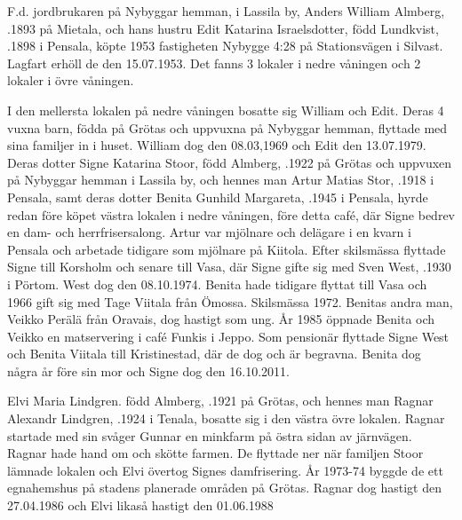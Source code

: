 
F.d. jordbrukaren på Nybyggar hemman, i Lassila by, Anders William Almberg, .1893 på Mietala, och hans hustru Edit Katarina Israelsdotter, född Lundkvist, .1898 i Pensala, köpte 1953 fastigheten Nybygge 4:28 på Stationsvägen i Silvast. Lagfart erhöll de den 15.07.1953. Det fanns 3 lokaler i nedre våningen och 2 lokaler i övre våningen.

I den mellersta lokalen på nedre våningen bosatte sig William och Edit. Deras 4 vuxna barn, födda på Grötas och uppvuxna på Nybyggar hemman, flyttade med sina familjer in i huset. William dog den 08.03,1969 och Edit den 13.07.1979. Deras dotter Signe Katarina Stoor, född Almberg, .1922 på Grötas och uppvuxen på Nybyggar hemman i Lassila by, och hennes man Artur Matias Stor, .1918 i Pensala, samt deras dotter Benita Gunhild Margareta, .1945 i Pensala, hyrde redan före köpet västra lokalen i nedre våningen, före detta café, där Signe bedrev en dam- och herrfrisersalong.
Artur var mjölnare och delägare i en kvarn i Pensala och arbetade tidigare som mjölnare på Kiitola. Efter skilsmässa flyttade Signe till Korsholm och senare till Vasa, där Signe gifte sig med Sven West, .1930 i Pörtom. West dog den 08.10.1974.  Benita hade tidigare flyttat till Vasa och 1966 gift sig med Tage Viitala från Ömossa.  Skilsmässa 1972. Benitas andra man, Veikko Perälä från Oravais, dog hastigt som ung. År 1985 öppnade Benita och Veikko en matservering i café Funkis i Jeppo. Som pensionär flyttade Signe West och Benita Viitala till Kristinestad, där de dog och är begravna. Benita dog några år före sin mor och Signe dog den 16.10.2011.

Elvi Maria Lindgren. född Almberg, .1921 på Grötas, och hennes man Ragnar Alexandr Lindgren, .1924 i Tenala, bosatte sig i den västra övre lokalen. Ragnar startade med sin svåger Gunnar en minkfarm på östra sidan av järnvägen. Ragnar hade hand om och skötte farmen. De flyttade ner när familjen Stoor lämnade lokalen och Elvi övertog Signes damfrisering. År 1973-74 byggde de ett egnahemshus på stadens planerade områden på Grötas. Ragnar dog hastigt den 27.04.1986 och Elvi likaså hastigt den 01.06.1988

